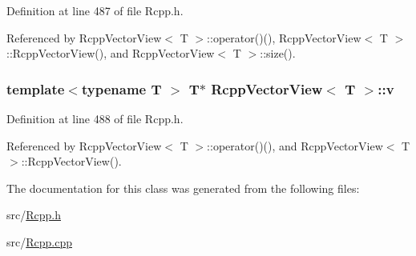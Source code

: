 Definition at line 487 of file Rcpp.h.

Referenced by RcppVectorView$<$ T $>$::operator()(), RcppVectorView$<$ T $>$::RcppVectorView(), and RcppVectorView$<$ T $>$::size().\hypertarget{classRcppVectorView_ae3dc3546d0dd0e3de95800b7c91857e8}{
\subsubsection[{v}]{\setlength{\rightskip}{0pt plus 5cm}template$<$typename T $>$ T$\ast$ {\bf RcppVectorView}$<$ T $>$::{\bf v}}}
\label{classRcppVectorView_ae3dc3546d0dd0e3de95800b7c91857e8}


Definition at line 488 of file Rcpp.h.

Referenced by RcppVectorView$<$ T $>$::operator()(), and RcppVectorView$<$ T $>$::RcppVectorView().

The documentation for this class was generated from the following files:\begin{DoxyCompactItemize}
\item 
src/\hyperlink{Rcpp_8h}{Rcpp.h}\item 
src/\hyperlink{Rcpp_8cpp}{Rcpp.cpp}\end{DoxyCompactItemize}
